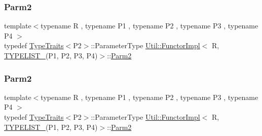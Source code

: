 \subsubsection{\texorpdfstring{Parm2}{Parm2}\hspace{0.1cm}{\footnotesize\ttfamily [2/3]}}
{\footnotesize\ttfamily template$<$typename R , typename P1 , typename P2 , typename P3 , typename P4 $>$ \\
typedef \mbox{\hyperlink{classUtil_1_1TypeTraits}{Type\+Traits}}$<$P2$>$\+::Parameter\+Type \mbox{\hyperlink{classUtil_1_1FunctorImpl}{Util\+::\+Functor\+Impl}}$<$ R, \mbox{\hyperlink{adat__devel__install_2include_2adat_2typelist_8h_a7a156c571ab21a16b0495e1c882a07fa}{T\+Y\+P\+E\+L\+I\+S\+T\+\_}}(P1, P2, P3, P4)$>$\+::\mbox{\hyperlink{structUtil_1_1Private_1_1FunctorImplBase_a554085cd798ef14838a59b528f0feb2e}{Parm2}}}

\mbox{\label{classUtil_1_1FunctorImpl_3_01R_00_01TYPELIST__4_07P1_00_01P2_00_01P3_00_01P4_08_4_aaf289567dfbd9f3379db79d06f02f4a7}} 
\subsubsection{\texorpdfstring{Parm2}{Parm2}\hspace{0.1cm}{\footnotesize\ttfamily [3/3]}}
{\footnotesize\ttfamily template$<$typename R , typename P1 , typename P2 , typename P3 , typename P4 $>$ \\
typedef \mbox{\hyperlink{classUtil_1_1TypeTraits}{Type\+Traits}}$<$P2$>$\+::Parameter\+Type \mbox{\hyperlink{classUtil_1_1FunctorImpl}{Util\+::\+Functor\+Impl}}$<$ R, \mbox{\hyperlink{adat__devel__install_2include_2adat_2typelist_8h_a7a156c571ab21a16b0495e1c882a07fa}{T\+Y\+P\+E\+L\+I\+S\+T\+\_}}(P1, P2, P3, P4)$>$\+::\mbox{\hyperlink{structUtil_1_1Private_1_1FunctorImplBase_a554085cd798ef14838a59b528f0feb2e}{Parm2}}}

\mbox{\label{classUtil_1_1FunctorImpl_3_01R_00_01TYPELIST__4_07P1_00_01P2_00_01P3_00_01P4_08_4_a50b605c92c54da7770a000867a97287a}} 

